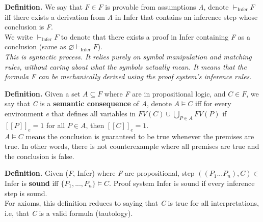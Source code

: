 \documentclass[11pt]{article}
\begin{document}
\begin{tcolorbox}[
    enhanced,
    frame hidden,
    borderline west={2pt}{0pt}{black},
    boxsep=5pt,
    left=8pt
]
\textbf{Definition.} We say that $F \in F$ is provable from assumptions \textit{A}, denote $\vdash_{\text{Infer}} F$ iff there exists a derivation from \textit{A} in Infer that contains an inference step whose conclusion is \textit{F}. \\

We write $\vdash_{\text{Infer}} F$ to denote that there exists a proof in Infer containing \textit{F} as a conclusion (same as $\varnothing \vdash_{\text{Infer}} F$).  \\

\emph{This is syntactic process. It relies purely on symbol manipulation and matching rules, without caring about what the symbols actually mean. It means that the formula F can be mechanically derived using the proof system's inference rules.}
\end{tcolorbox}

\begin{tcolorbox}[
    enhanced,
    frame hidden,
    borderline west={2pt}{0pt}{black},
    boxsep=5pt,
    left=8pt
]
\textbf{Definition.}  Given a set $A \subseteq F$ where \textit{F} are in propositional logic, and $C \in F$, we say that \textit{C} is a \textbf{semantic consequence} of \textit{A}, denote $A \models C$ iff for every environment \textit{e} that defines all variables in $FV(C) \cup \bigcup_{P \in A} FV(P) $ if $[\![P]\!]_e = 1$ for all $P \in A$, then $[\![C]\!]_e = 1$. \\ 

$A \models C$ means the conclusion is guaranteed to be true whenever the premises are true. In other words, there is not counterexample where all premises are true and the conclusion is false. 
\end{tcolorbox}

\begin{tcolorbox}[
    enhanced,
    frame hidden,
    borderline west={2pt}{0pt}{black},
    boxsep=5pt,
    left=8pt
]
\textbf{Definition.} Given (\textit{F}, Infer) where \textit{F} are propositional, step $((P_1...P_n), C) \in$ Infer is \textbf{sound} iff $\{P_1, ..., P_n\} \models C$. Proof system Infer is sound if every inference step is sound. \\

For axioms, this definition reduces to saying that \textit{C} is true for all interpretations, i.e, that \textit{C} is a valid formula (tautology). 
\end{tcolorbox}
\end{document}
